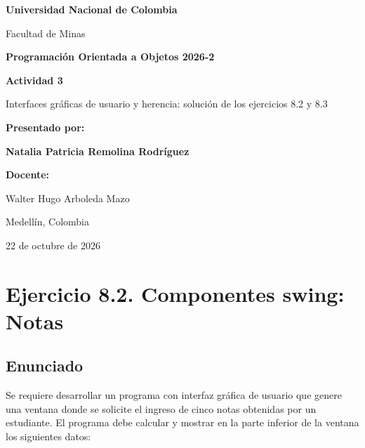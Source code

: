\documentclass[11pt, a4paper]{article}
\begin{document}
\begin{titlepage}
    \centering
    \vspace*{1cm}

    {\huge \textbf{Universidad Nacional de Colombia}\par}
    \vspace{0.5cm}
    {\Large Facultad de Minas\par}
    \vspace{1.5cm}

    {\Large \textbf{Programación Orientada a Objetos 2026-2}\par}
    \vspace{2cm}

    {\huge \textbf{Actividad 3}\par}
    \vspace{0.5cm}
    {\large Interfaces gráficas de usuario y herencia: solución de los ejercicios 8.2 y 8.3\par}

    \vspace{3cm}

    \textbf{Presentado por:}\par
    \vspace{0.5cm}
    {\Large \textbf{Natalia Patricia Remolina Rodríguez}\par}

    \vspace{2cm}

    \textbf{Docente:}\par
    Walter Hugo Arboleda Mazo\par

    \vspace{2cm}

    Medellín, Colombia\par
    22 de octubre de 2026
\end{titlepage}

\section{Ejercicio 8.2. Componentes swing: Notas}

\subsection{Enunciado}
Se requiere desarrollar un programa con interfaz gráfica de usuario que genere una ventana
donde se solicite el ingreso de cinco notas obtenidas por un estudiante. El programa debe
calcular y mostrar en la parte inferior de la ventana los siguientes datos:
\end{document}
